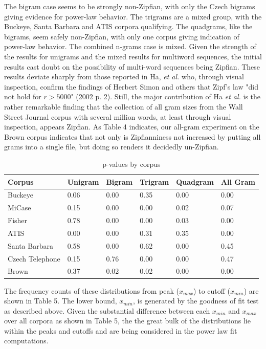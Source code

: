 \documentclass[12pt]{article}
\begin{document}
The bigram case seems to be strongly non-Zipfian, with only the Czech bigrams giving evidence for power-law behavior. The trigrams are a mixed group, with the Buckeye, Santa Barbara and ATIS corpora qualifying. The quadgrams, like the bigrams, seem safely non-Zipfian, with only one corpus giving indication of power-law behavior. The combined n-grams case is mixed.  Given the strength of the results for unigrams and the mixed results for multiword sequences, the initial results cast doubt on the possibility of multi-word sequences being Zipfian.  These results deviate sharply from those reported in Ha, \emph{et al.} who, through visual inspection, confirm the findings of Herbert Simon and others that Zipf's law "did not hold for $r > 5000$" (2002 p. 2).  Still, the major contribution of Ha \emph{et al.} is the rather remarkable finding that the collection of all gram sizes from the Wall Street Journal corpus with several million words, at least through visual inspection, appears Zipfian.  As Table 4 indicates, our all-gram experiment on the Brown corpus indicates that not only is Zipfianniness not increased by putting all grams into a single file, but doing so renders it decidedly un-Zipfian.


\begin{table}[H]
\caption{p-values by corpus}
\begin{center}
\begin{tabular}{ |l|l|l|l|l|l| } 
\hline
 Corpus & Unigram & Bigram & Trigram & Quadgram & All Gram\\ [0.5ex] 
 \hline
 Buckeye & 0.06 & 0.00 & 0.35 & 0.00 & 0.00 \\ 
 MiCase & 0.15 & 0.00 & 0.00 & 0.02 & 0.07\\
 Fisher & 0.78 & 0.00 & 0.00 & 0.03 & 0.00 \\ 
 ATIS & 0.00 & 0.00 & 0.31 & 0.35 & 0.00 \\
 Santa Barbara & 0.58 & 0.00 & 0.62 & 0.00 & 0.45 \\
 Czech Telephone & 0.15 & 0.76 & 0.00 & 0.00 & 0.47 \\
 Brown & 0.37 & 0.02 & 0.02 & 0.00 & 0.00 \\ 
 \hline
\end{tabular}
\end{center}
\end{table}

The frequency counts of these distributions from peak ($x_{max}$) to cutoff ($x_{min}$) are shown in Table 5.  The lower bound, $x_{min}$, is generated by the goodness of fit test as described above.  Given the substantial difference between each $x_{min}$ and $x_{max}$ over all corpora as shown in Table 5, the the great bulk of the distributions lie within the peaks and cutoffs and are being considered in the power law fit computations.
\end{document}
